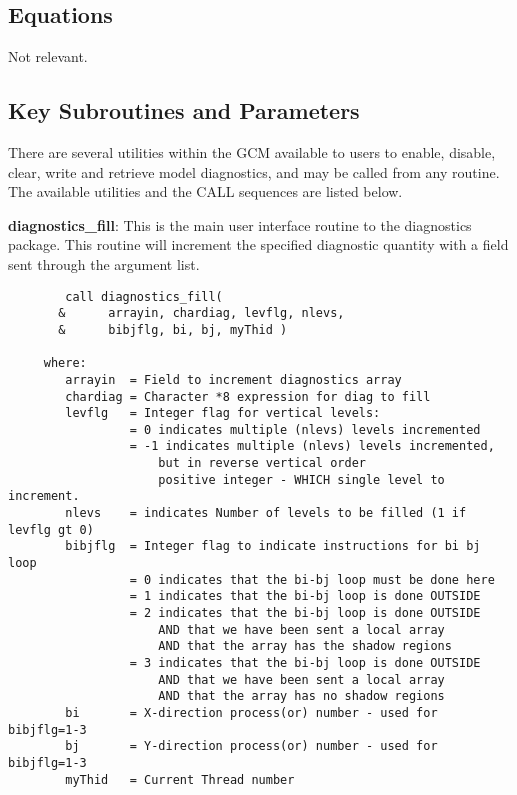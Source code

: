 \subsection{Equations}
Not relevant.

\subsection{Key Subroutines and Parameters}
\label{sec:diagnostics:diagover}

\noindent
There are several utilities within the GCM available to users to
enable, disable, clear, write and retrieve model diagnostics, and may
be called from any routine.  The available utilities and the CALL
sequences are listed below.

\noindent
{\bf diagnostics\_fill}: This is the main user interface routine to
the diagnostics package. This routine will increment the specified
diagnostic quantity with a field sent through the argument list.

\begin{verbatim}
        call diagnostics_fill(
       &      arrayin, chardiag, levflg, nlevs,
       &      bibjflg, bi, bj, myThid )

     where:
        arrayin  = Field to increment diagnostics array
        chardiag = Character *8 expression for diag to fill
        levflg   = Integer flag for vertical levels:
                 = 0 indicates multiple (nlevs) levels incremented
                 = -1 indicates multiple (nlevs) levels incremented,
                     but in reverse vertical order
                     positive integer - WHICH single level to increment.
        nlevs    = indicates Number of levels to be filled (1 if levflg gt 0)
        bibjflg  = Integer flag to indicate instructions for bi bj loop
                 = 0 indicates that the bi-bj loop must be done here
                 = 1 indicates that the bi-bj loop is done OUTSIDE
                 = 2 indicates that the bi-bj loop is done OUTSIDE
                     AND that we have been sent a local array
                     AND that the array has the shadow regions
                 = 3 indicates that the bi-bj loop is done OUTSIDE
                     AND that we have been sent a local array
                     AND that the array has no shadow regions
        bi       = X-direction process(or) number - used for bibjflg=1-3
        bj       = Y-direction process(or) number - used for bibjflg=1-3
        myThid   = Current Thread number
\end{verbatim}

